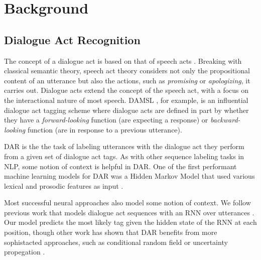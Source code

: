 \documentclass[11pt,a4paper]{article}
\begin{document}
\section{Background}

\subsection{Dialogue Act Recognition}
The concept of a dialogue act is based on that of speech acts \citep{austinHowThingsWords2009}.
Breaking with classical semantic theory, speech act theory considers not only the propositional content of an utterance but also the actions, such as \emph{promising} or \emph{apologizing}, it carries out.
Dialogue acts extend the concept of the speech act, with a focus on the interactional nature of most speech.
DAMSL \citep{coreCodingDialogsDAMSL1997}, for example, is an influential dialogue act tagging scheme where dialogue acts are defined in part by whether they have a \emph{forward-looking} function (are expecting a response) or \emph{backward-looking} function (are in response to a previous utterance).

DAR is the the task of labeling utterances with the dialogue act they perform 
from a given set of dialogue act tags.
As with other sequence labeling tasks in NLP, some notion of context is helpful in DAR.
One of the first performant machine learning models for DAR was a Hidden Markov Model that used various lexical and prosodic features as input \citep{stolckeDialogueActModeling2000}.

Most successful neural approaches also model some notion of context.
We follow previous work that models dialogue act sequences with an RNN over utterances \citep{kalchbrennerRecurrentConvolutionalNeural2013,tranHierarchicalNeuralModel2017,botheContextbasedApproachDialogue2018}.
Our model predicts the most likely tag given the hidden state of the RNN at each position, though other work has shown that DAR benefits from more sophistacted approaches, such as conditional random field \citep{chenDialogueActRecognition2017} or uncertainty propegation \citep{tranPreservingDistributionalInformation2017}. 
\end{document}
